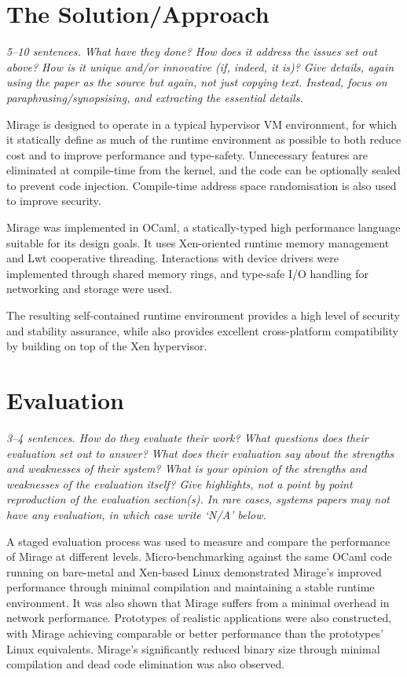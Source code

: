 \documentclass[11pt]{article}
\begin{document}
\section*{The Solution/Approach}
\textsl{5--10 sentences. What have they done? How does it address the issues set out above? How is it unique and/or innovative (if, indeed, it is)? Give details, again using the paper as the source but again, not just copying text. Instead, focus on paraphrasing/synopsising, and extracting the essential details.}

Mirage is designed to operate in a typical hypervisor VM environment, for which it statically define as much of the runtime environment as possible to both reduce cost and to improve performance and type-safety. Unnecessary features are eliminated at compile-time from the kernel, and the code can be optionally sealed to prevent code injection. Compile-time address space randomisation is also used to improve security.

Mirage was implemented in OCaml, a statically-typed high performance language suitable for its design goals. It uses Xen-oriented runtime memory management and Lwt cooperative threading. Interactions with device drivers were implemented through shared memory rings, and type-safe I/O handling for networking and storage were used.

The resulting self-contained runtime environment provides a high level of security and stability assurance, while also provides excellent cross-platform compatibility by building on top of the Xen hypervisor.

\section*{Evaluation}
\textsl{3--4 sentences. How do they evaluate their work? What questions does their evaluation set out to answer? What does their evaluation say about the strengths and weaknesses of their system? What is your opinion of the strengths and weaknesses of the evaluation itself?  Give highlights, not a point by point reproduction of the evaluation section(s). In rare cases, systems papers may not have any evaluation, in which case write `N/A' below.}

A staged evaluation process was used to measure and compare the performance of Mirage at different levels. Micro-benchmarking against the same OCaml code running on bare-metal and Xen-based Linux demonstrated Mirage's improved performance through minimal compilation and maintaining a stable runtime environment. It was also shown that Mirage suffers from a minimal overhead in network performance. Prototypes of realistic applications were also constructed, with Mirage achieving comparable or better performance than the prototypes' Linux equivalents. Mirage's significantly reduced binary size through minimal compilation and dead code elimination was also observed.
\end{document}
